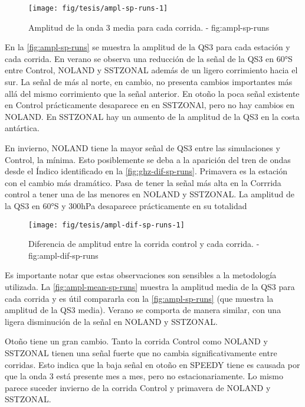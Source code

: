 \documentclass[spanish,a4paper,12p]{book}
\begin{document}
\begin{figure*}
\texttt{[image: fig/tesis/ampl-sp-runs-1]} \caption{Amplitud de la onda 3 media para cada corrida. - fig:ampl-sp-runs}\label{fig:ampl-sp-runs}
\end{figure*}

En la \autoref{fig:ampl-sp-runs} se muestra la amplitud de la QS3 para
cada estación y cada corrida. En verano se observa una reducción de la
señal de la QS3 en 60°S entre Control, NOLAND y SSTZONAL además de un
ligero corrimiento hacia el sur. La señal de más al norte, en cambio, no
presenta cambios importantes más allá del mismo corrimiento que la señal
anterior. En otoño la poca señal existente en Control prácticamente
desaparece en en SSTZONAl, pero no hay cambios en NOLAND. En SSTZONAL
hay un aumento de la amplitud de la QS3 en la costa antártica.

En invierno, NOLAND tiene la mayor señal de QS3 entre las simulaciones y
Control, la mínima. Esto posiblemente se deba a la aparición del tren de
ondas desde el Índico identificado en la \autoref{fig:ghz-dif-sp-runs}.
Primavera es la estación con el cambio más dramático. Pasa de tener la
señal más alta en la Corrrida control a tener una de las menores en
NOLAND y SSTZONAL. La amplitud de la QS3 en 60°S y 300hPa desaparece
prácticamente en su totalidad


\begin{figure*}
\texttt{[image: fig/tesis/ampl-dif-sp-runs-1]} \caption{Diferencia de amplitud entre la corrida control y cada corrida. - fig:ampl-dif-sp-runs}\label{fig:ampl-dif-sp-runs}
\end{figure*}

Es importante notar que estas observaciones son sensibles a la
metodología utilizada. La \autoref{fig:ampl-mean-sp-runs} muestra la
amplitud media de la QS3 para cada corrida y es útil compararla con la
\autoref{fig:ampl-sp-runs} (que muestra la amplitud de la QS3 media).
Verano se comporta de manera similar, con una ligera disminución de la
señal en NOLAND y SSTZONAL.

Otoño tiene un gran cambio. Tanto la corrida Control como NOLAND y
SSTZONAL tienen una señal fuerte que no cambia significativamente entre
corridas. Esto indica que la baja señal en otoño en SPEEDY tiene es
causada por que la onda 3 está presente mes a mes, pero no
estacionariamente. Lo mismo parece suceder invierno de la corrida
Control y primavera de NOLAND y SSTZONAL.
\end{document}
